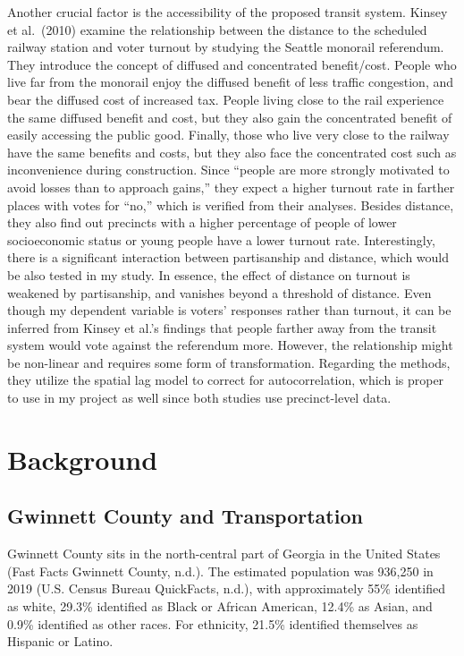 \documentclass[
]{article}
\begin{document}
Another crucial factor is the accessibility of the proposed transit
system. Kinsey et al.~(2010) examine the relationship between the
distance to the scheduled railway station and voter turnout by studying
the Seattle monorail referendum. They introduce the concept of diffused
and concentrated benefit/cost. People who live far from the monorail
enjoy the diffused benefit of less traffic congestion, and bear the
diffused cost of increased tax. People living close to the rail
experience the same diffused benefit and cost, but they also gain the
concentrated benefit of easily accessing the public good. Finally, those
who live very close to the railway have the same benefits and costs, but
they also face the concentrated cost such as inconvenience during
construction. Since ``people are more strongly motivated to avoid losses
than to approach gains,'' they expect a higher turnout rate in farther
places with votes for ``no,'' which is verified from their analyses.
Besides distance, they also find out precincts with a higher percentage
of people of lower socioeconomic status or young people have a lower
turnout rate. Interestingly, there is a significant interaction between
partisanship and distance, which would be also tested in my study. In
essence, the effect of distance on turnout is weakened by partisanship,
and vanishes beyond a threshold of distance. Even though my dependent
variable is voters' responses rather than turnout, it can be inferred
from Kinsey et al.'s findings that people farther away from the transit
system would vote against the referendum more. However, the relationship
might be non-linear and requires some form of transformation. Regarding
the methods, they utilize the spatial lag model to correct for
autocorrelation, which is proper to use in my project as well since both
studies use precinct-level data.

\hypertarget{background}{%
\section{Background}\label{background}}

\hypertarget{gwinnett-county-and-transportation}{%
\subsection{Gwinnett County and
Transportation}\label{gwinnett-county-and-transportation}}

Gwinnett County sits in the north-central part of Georgia in the United
States (Fast Facts \textbar{} Gwinnett County, n.d.). The estimated
population was 936,250 in 2019 (U.S. Census Bureau QuickFacts, n.d.),
with approximately 55\% identified as white, 29.3\% identified as Black
or African American, 12.4\% as Asian, and 0.9\% identified as other
races. For ethnicity, 21.5\% identified themselves as Hispanic or
Latino.
\end{document}
